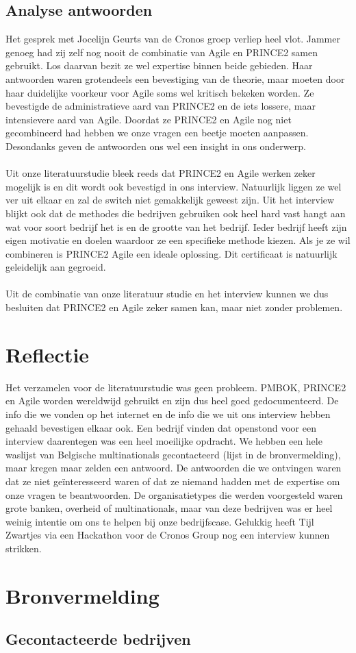 \documentclass[]{article}
\begin{document}
\subsection{Analyse antwoorden}
Het gesprek met Jocelijn Geurts van de Cronos groep verliep heel vlot. Jammer genoeg had zij zelf nog nooit de combinatie van Agile en PRINCE2 samen gebruikt. Los daarvan bezit ze wel expertise binnen beide gebieden. Haar antwoorden waren grotendeels een bevestiging van de theorie, maar moeten door haar duidelijke voorkeur voor Agile soms wel kritisch bekeken worden. Ze bevestigde de administratieve aard van PRINCE2 en de iets lossere, maar intensievere aard van Agile. Doordat ze PRINCE2 en Agile nog niet gecombineerd had hebben we onze vragen een beetje moeten aanpassen. Desondanks geven de antwoorden ons wel een insight in ons onderwerp. \\\\
Uit onze literatuurstudie bleek reeds dat PRINCE2 en Agile werken zeker mogelijk is en dit wordt ook bevestigd in ons interview. Natuurlijk liggen ze wel ver uit elkaar en zal de switch niet gemakkelijk geweest zijn. Uit het interview blijkt ook dat de methodes die bedrijven gebruiken ook heel hard vast hangt aan wat voor soort bedrijf het is en de grootte van het bedrijf. Ieder bedrijf heeft zijn eigen motivatie en doelen waardoor ze een specifieke methode kiezen. Als je ze wil combineren is PRINCE2 Agile een ideale oplossing. Dit certificaat is natuurlijk geleidelijk aan gegroeid. \\\\
Uit de combinatie van onze literatuur studie en het interview kunnen we dus besluiten dat PRINCE2 en Agile zeker samen kan, maar niet zonder problemen.

\section{Reflectie}
Het verzamelen voor de literatuurstudie was geen probleem. PMBOK, PRINCE2 en Agile worden wereldwijd gebruikt en zijn dus heel goed gedocumenteerd. De info die we vonden op het internet en de info die we uit ons interview hebben gehaald bevestigen elkaar ook. Een bedrijf vinden dat openstond voor een interview daarentegen was een heel moeilijke opdracht. We hebben een hele waslijst van Belgische multinationals gecontacteerd (lijst in de bronvermelding), maar kregen maar zelden een antwoord. De antwoorden die we ontvingen waren dat ze niet geïnteresseerd waren of dat ze niemand hadden met de expertise om onze vragen te beantwoorden. De organisatietypes die werden voorgesteld waren grote banken, overheid of multinationals, maar van deze bedrijven was er heel weinig intentie om ons te helpen bij onze bedrijfscase. Gelukkig heeft Tijl Zwartjes via een Hackathon voor de Cronos Group nog een interview kunnen strikken.
\section{Bronvermelding}

\subsection{Gecontacteerde bedrijven}

\nocite{*}
\printbibliography
\end{document}

